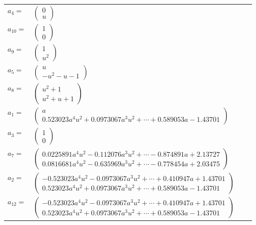 \documentclass[1p]{elsarticle_modified}
\theoremstyle{definition}
\begin{document}
\begin{tabular}{m{7pt} m{180pt} m{7pt} m{180pt} }
\flushright $a_{4}=$&$\begin{pmatrix}0\\u\end{pmatrix}$ \\
\flushright $a_{10}=$&$\begin{pmatrix}1\\0\end{pmatrix}$ \\
\flushright $a_{9}=$&$\begin{pmatrix}1\\u^2\end{pmatrix}$ \\
\flushright $a_{5}=$&$\begin{pmatrix}u\\- u^2- u-1\end{pmatrix}$ \\
\flushright $a_{8}=$&$\begin{pmatrix}u^2+1\\u^2+u+1\end{pmatrix}$ \\
\flushright $a_{1}=$&$\begin{pmatrix}a\\0.523023 a^{4} u^{2}+0.0973067 a^{3} u^{2}+\cdots+0.589053 a-1.43701\end{pmatrix}$ \\
\flushright $a_{3}=$&$\begin{pmatrix}1\\0\end{pmatrix}$ \\
\flushright $a_{7}=$&$\begin{pmatrix}0.0225891 a^{4} u^{2}-0.112076 a^{3} u^{2}+\cdots-0.874891 a+2.13727\\0.0816681 a^{4} u^{2}-0.635969 a^{3} u^{2}+\cdots-0.778454 a+2.03475\end{pmatrix}$ \\
\flushright $a_{2}=$&$\begin{pmatrix}-0.523023 a^{4} u^{2}-0.0973067 a^{3} u^{2}+\cdots+0.410947 a+1.43701\\0.523023 a^{4} u^{2}+0.0973067 a^{3} u^{2}+\cdots+0.589053 a-1.43701\end{pmatrix}$ \\
\flushright $a_{12}=$&$\begin{pmatrix}-0.523023 a^{4} u^{2}-0.0973067 a^{3} u^{2}+\cdots+0.410947 a+1.43701\\0.523023 a^{4} u^{2}+0.0973067 a^{3} u^{2}+\cdots+0.589053 a-1.43701\end{pmatrix}$ \\

\end{tabular}
\end{document}
